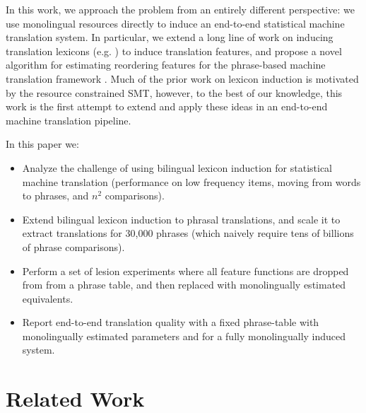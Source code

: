 \documentclass[11pt]{article}
\newcommand{\secref}[1]{Section~\ref{#1}}
\begin{document}
In this work, we approach the problem from an entirely different perspective: we use monolingual resources directly to induce an end-to-end statistical machine translation system.  In particular, we extend a long line of work on inducing translation lexicons (e.g. \cite{Rapp:1995,Fung:1998,Koehn:2000,Klementiev:2006b,Haghighi:2008,Mimno:2009}) to induce translation features, and propose a novel algorithm for estimating reordering features for the phrase-based machine translation framework \cite{Koehn:2003}.  Much of the prior work on lexicon induction is motivated by the resource constrained SMT, however, to the best of our knowledge, this work is the first attempt to extend and apply these ideas in an end-to-end machine translation pipeline.


In this paper we:
\begin{itemize}
\item Analyze the challenge of using bilingual lexicon induction for statistical machine translation (performance on low frequency items, moving from words to phrases, and $n^2$ comparisons).
\item Extend bilingual lexicon induction to phrasal translations, and scale it to extract translations for 30,000 phrases (which naively require tens of billions of phrase comparisons). 
\item Perform a set of lesion experiments where all feature functions are dropped from from a phrase table, and then replaced with monolingually estimated equivalents.
\item Report end-to-end translation quality with a fixed phrase-table with monolingually estimated parameters and for a fully monolingually induced system.
\end{itemize}

\section{Related Work} \label{sect:related-work}
\end{document}
